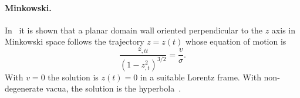 





    \paragraph{Minkowski.} %
    In~\citet{garrigaPerturbationsDomainWalls1991} it is shown that a planar domain wall oriented perpendicular to the $z$ axis in Minkowski space follows the trajectory $z=z(t)$ whose equation of motion is 
    \begin{equation}
        \frac{z_{,tt}}{{(1-z_{,t}^2)}^{3/2}} = \frac{v}{\sigma}.
    \end{equation}
    With $v=0$ the solution is $z(t)=0$ in a suitable Lorentz frame. %
    With non-degenerate vacua, the solution is the hyperbola~\citep{garrigaPerturbationsDomainWalls1991}.
    






